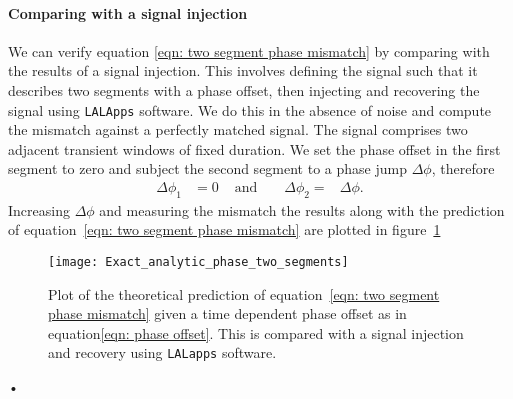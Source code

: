 \paragraph{Comparing with a signal injection} We can verify equation
\eqref{eqn: two segment phase mismatch} by comparing with the results of a
signal injection. This involves defining the signal such that it describes two
segments with a phase offset, then injecting and recovering the signal using
\texttt{LALApps} software. We do this in the absence of noise and compute the mismatch 
against a perfectly matched signal.  The signal comprises two adjacent
transient windows of fixed duration. We set the phase offset in the first segment
to zero and subject the second segment to a phase
jump $\Delta \phi$, therefore 
\begin{align}
    \Delta \phi_{1} &= 0 &  \textrm{ and } && \Delta \phi_{2} =& \Delta\phi.
\end{align}
Increasing $\Delta\phi$ and measuring the mismatch the results along
with the prediction of equation~\eqref{eqn: two segment phase mismatch} are
plotted in figure~\ref{fig: two plot}
\begin{figure}
\centering
\texttt{[image: Exact\_analytic\_phase\_two\_segments]}
\caption{Plot of the theoretical prediction of equation~\eqref{eqn: two segment
phase mismatch} given a time dependent phase offset as in equation\eqref{eqn:
phase offset}. This is compared  with a signal injection and recovery
using \texttt{LALapps} software.}
\label{fig: two plot}
\end{figure}•

\FloatBarrier
